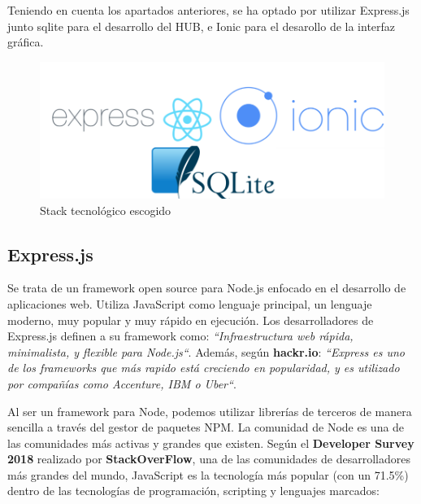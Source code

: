 Teniendo en cuenta los apartados anteriores, se ha optado por utilizar Express.js junto sqlite para el desarrollo del HUB, e Ionic para el desarollo de
la interfaz gráfica.

\begin{figure}[H]
\centering
\includegraphics[width=5.00in]{images/stack_tecnologico.png}
\caption{Stack tecnológico escogido}
\label{fig:stack_teconologico}
\end{figure}

\subsection{Express.js}
Se trata de un framework open source para Node.js enfocado en el desarrollo de aplicaciones web. Utiliza JavaScript como lenguaje principal, un lenguaje moderno, muy popular y
muy rápido en ejecución. Los desarrolladores de Express.js definen a su framework como: \textit{``Infraestructura web rápida, minimalista, y flexible para Node.js``}.
Además, según \textbf{hackr.io}: \textit{``Express es uno de los frameworks que más rapido está creciendo en popularidad, y es utilizado por compañías como Accenture, IBM o
Uber``}.
\par
Al ser un framework para Node, podemos utilizar librerías de terceros de manera sencilla a través del gestor de paquetes NPM. La comunidad de Node es una de las comunidades más activas
y grandes que existen.
\newpage
Según el \textbf{Developer Survey 2018} realizado por \textbf{StackOverFlow}, una de las comunidades de desarrolladores más grandes del mundo, JavaScript es la tecnología
 más popular (con un 71.5\%) dentro de las tecnologías de programación, scripting y lenguajes marcados:


